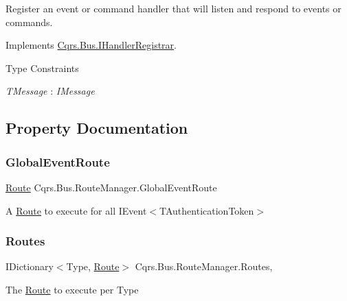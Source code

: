 Register an event or command handler that will listen and respond to events or commands. 



Implements \hyperlink{interfaceCqrs_1_1Bus_1_1IHandlerRegistrar_a07792dcc9a8b272709ff2e2dd336a642_a07792dcc9a8b272709ff2e2dd336a642}{Cqrs.\+Bus.\+I\+Handler\+Registrar}.

\begin{Desc}
\item[Type Constraints]\begin{description}
\item[{\em T\+Message} : {\em I\+Message}]\end{description}
\end{Desc}


\subsection{Property Documentation}
\mbox{\label{classCqrs_1_1Bus_1_1RouteManager_a083b3775e28b500eca7351c9990e15a3_a083b3775e28b500eca7351c9990e15a3}} 
\subsubsection{\texorpdfstring{Global\+Event\+Route}{GlobalEventRoute}}
{\footnotesize\ttfamily \hyperlink{classCqrs_1_1Bus_1_1Route}{Route} Cqrs.\+Bus.\+Route\+Manager.\+Global\+Event\+Route\hspace{0.3cm}{\ttfamily [get]}}



A \hyperlink{classCqrs_1_1Bus_1_1Route}{Route} to execute for all I\+Event$<$\+T\+Authentication\+Token$>$ 

\mbox{\label{classCqrs_1_1Bus_1_1RouteManager_ad6a3c8e41e10f62d075e52d08d817cee_ad6a3c8e41e10f62d075e52d08d817cee}} 
\subsubsection{\texorpdfstring{Routes}{Routes}}
{\footnotesize\ttfamily I\+Dictionary$<$Type, \hyperlink{classCqrs_1_1Bus_1_1Route}{Route}$>$ Cqrs.\+Bus.\+Route\+Manager.\+Routes\hspace{0.3cm}{\ttfamily [get]}, {\ttfamily [protected]}}



The \hyperlink{classCqrs_1_1Bus_1_1Route}{Route} to execute per Type 

